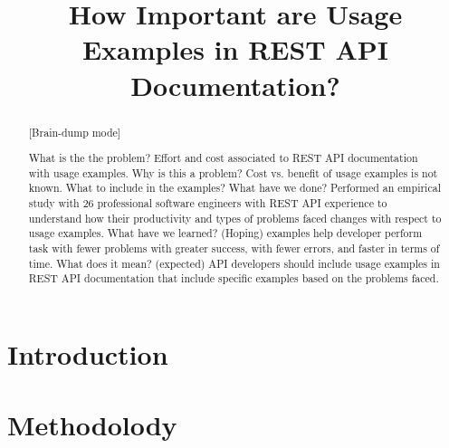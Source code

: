 \documentclass[conference]{IEEEtran}
\begin{document}
\title{How Important are Usage Examples in REST API Documentation?}

\author{
\and
{}
\and
{}
}

\maketitle

\begin{abstract}

[Brain-dump mode]

What is the the problem? Effort and cost associated to REST API documentation with usage examples.
Why is this a problem? Cost vs. benefit of usage examples is not known. What to include in the examples?
What have we done? Performed an empirical study with 26 professional software engineers with REST API experience to understand how their productivity and types of problems faced changes with respect to usage examples.
What have we learned? (Hoping) examples help developer perform task with fewer problems with greater success, with fewer errors, and faster in terms of time.
What does it mean? (expected) API developers should include usage examples in REST API documentation that include specific examples based on the problems faced.


\end{abstract}


\IEEEpeerreviewmaketitle

\section{Introduction}
\section{Methodolody}
\end{document}
